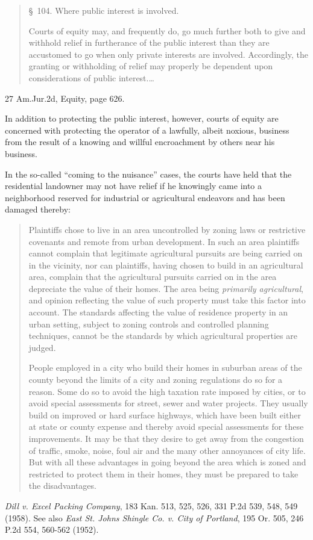 \begin{quote}
\S~104. Where public interest is involved.

Courts of equity may, and frequently do, go much further both to give and
withhold relief in furtherance of the public interest than they are accustomed
to go when only private interests are involved. Accordingly, the granting or
withholding of relief may properly be dependent upon considerations of public
interest.\ldots
\end{quote}
27 Am.Jur.2d, Equity, page 626.

In addition to protecting the public interest, however, courts of equity are
concerned with protecting the operator of a lawfully, albeit noxious, business
from the result of a knowing and willful encroachment by others near his
business.

In the so-called ``coming to the nuisance'' cases, the courts have held that the
residential landowner may not have relief if he knowingly came into a
neighborhood reserved for industrial or agricultural endeavors and has been
damaged thereby:
\begin{quotation}
Plaintiffs chose to live in an area uncontrolled by zoning laws or
restrictive covenants and remote from urban development. In such an area
plaintiffs cannot complain that legitimate agricultural pursuits are being
carried on in the vicinity, nor can plaintiffs, having chosen to build in an
agricultural area, complain that the agricultural pursuits carried on in the
area depreciate the value of their homes. The area being \emph{primarily
agricultural},
and opinion reflecting the value of such property must take this factor into
account. The standards affecting the value of residence property in an urban
setting, subject to zoning controls and controlled planning techniques, cannot
be the standards by which agricultural properties are judged.

People employed in a city who build their homes in suburban areas of the
county beyond the limits of a city and zoning regulations do so for a reason.
Some do so to avoid the high taxation rate imposed by cities, or to avoid
special assessments for street, sewer and water projects. They usually build on
improved or hard surface highways, which have been built either at state or
county expense and thereby avoid special assessments for these improvements. It
may be that they desire to get away from the congestion of traffic, smoke,
noise, foul air and the many other annoyances of city life. But with all these
advantages in going beyond the area which is zoned and restricted to protect
them in their homes, they must be prepared to take the disadvantages.
\end{quotation}
\emph{Dill v. Excel Packing Company}, 183 Kan. 513, 525, 526, 331 P.2d 539, 548,
549 (1958). See also \emph{East St. Johns Shingle Co. v. City of Portland}, 195
Or. 505, 246 P.2d 554, 560-562 (1952).


